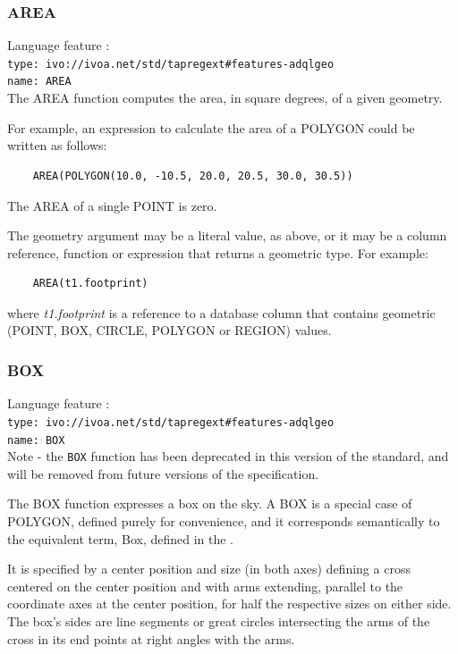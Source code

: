 \documentclass[11pt,a4paper]{ivoa}
\begin{document}
\subsubsection{AREA}
\label{sec:functions.geom.area}
{\footnotesize Language feature :}\\
{\footnotesize \verb|type: ivo://ivoa.net/std/tapregext#features-adqlgeo|}\\
{\footnotesize \verb|name: AREA|}\\

The AREA function computes the area, in square degrees, of a given geometry.

For example, an expression to calculate the area of a POLYGON could be
written as follows:
\begin{verbatim}
    AREA(POLYGON(10.0, -10.5, 20.0, 20.5, 30.0, 30.5))
\end{verbatim}

The AREA of a single POINT is zero.

The geometry argument may be a literal value, as above, or it may be a
column reference, function or expression that returns a geometric type.
For example:
\begin{verbatim}
    AREA(t1.footprint)
\end{verbatim}
where \textit{t1.footprint} is a reference to a database column that
contains geometric (POINT, BOX, CIRCLE, POLYGON or REGION) values.

\subsubsection{BOX}
\label{sec:functions.geom.box}
{\footnotesize Language feature :}\\
{\footnotesize \verb|type: ivo://ivoa.net/std/tapregext#features-adqlgeo|}\\
{\footnotesize \verb|name: BOX|}\\

Note - the \verb|BOX| function has been deprecated in this version of the standard,
and will be removed from future versions of the specification.

The BOX function expresses a box on the sky. A BOX is a special case of POLYGON,
defined purely for convenience,
and it corresponds semantically to the equivalent term, Box, defined in
the \STCSpec{}.

It is specified by a center position and size
(in both axes) defining a cross centered on the center position and
with arms extending, parallel to the coordinate axes at the center position,
for half the respective sizes on either side. The box’s sides are line
segments or great circles intersecting the arms of the cross in its end
points at right angles with the arms.
\end{document}
